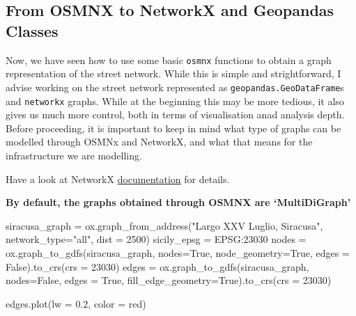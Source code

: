 \documentclass[
  letterpaper,
  DIV=11,
  numbers=noendperiod]{scrreprt}
\newenvironment{Shaded}{\begin{snugshade}}{\end{snugshade}}
\newcommand{\DecValTok}[1]{\textcolor[rgb]{0.68,0.00,0.00}{#1}}
\newcommand{\FloatTok}[1]{\textcolor[rgb]{0.68,0.00,0.00}{#1}}
\newcommand{\NormalTok}[1]{\textcolor[rgb]{0.00,0.23,0.31}{#1}}
\newcommand{\OperatorTok}[1]{\textcolor[rgb]{0.37,0.37,0.37}{#1}}
\newcommand{\StringTok}[1]{\textcolor[rgb]{0.13,0.47,0.30}{#1}}
\newcommand{\VariableTok}[1]{\textcolor[rgb]{0.07,0.07,0.07}{#1}}
\begin{document}
\subsection{From OSMNX to NetworkX and Geopandas
Classes}\label{from-osmnx-to-networkx-and-geopandas-classes}

Now, we have seen how to use some basic \texttt{osmnx} functions to
obtain a graph representation of the street network. While this is
simple and strightforward, I advise working on the street network
represented as \texttt{geopandas.GeoDataFrame}s and \texttt{networkx}
graphs. While at the beginning this may be more tedious, it also gives
us much more control, both in terms of visualisation anad analysis
depth. Before proceeding, it is important to keep in mind what type of
graphs can be modelled through OSMNx and NetworkX, and what that means
for the infrastructure we are modelling.

Have a look at NetworkX
\href{https://networkx.org/documentation/stable/reference/classes/index.html}{documentation}
for details.

\textbf{By default, the graphs obtained through OSMNX are
`MultiDiGraph'}

\begin{Shaded}
\begin{Highlighting}[]
\NormalTok{siracusa\_graph }\OperatorTok{=}\NormalTok{ ox.graph\_from\_address(}\StringTok{"Largo XXV Luglio, Siracusa"}\NormalTok{, network\_type}\OperatorTok{=}\StringTok{"all"}\NormalTok{, dist }\OperatorTok{=} \DecValTok{2500}\NormalTok{)}
\NormalTok{sicily\_epsg }\OperatorTok{=} \StringTok{\textquotesingle{}EPSG:23030\textquotesingle{}}
\NormalTok{nodes }\OperatorTok{=}\NormalTok{ ox.graph\_to\_gdfs(siracusa\_graph, nodes}\OperatorTok{=}\VariableTok{True}\NormalTok{, node\_geometry}\OperatorTok{=}\VariableTok{True}\NormalTok{, edges }\OperatorTok{=} \VariableTok{False}\NormalTok{).to\_crs(crs }\OperatorTok{=} \DecValTok{23030}\NormalTok{)}
\NormalTok{edges }\OperatorTok{=}\NormalTok{ ox.graph\_to\_gdfs(siracusa\_graph, nodes}\OperatorTok{=}\VariableTok{False}\NormalTok{, edges }\OperatorTok{=}  \VariableTok{True}\NormalTok{, fill\_edge\_geometry}\OperatorTok{=}\VariableTok{True}\NormalTok{).to\_crs(crs }\OperatorTok{=} \DecValTok{23030}\NormalTok{)}
\end{Highlighting}
\end{Shaded}

\begin{Shaded}
\begin{Highlighting}[]
\NormalTok{edges.plot(lw }\OperatorTok{=} \FloatTok{0.2}\NormalTok{, color }\OperatorTok{=} \StringTok{\textquotesingle{}red\textquotesingle{}}\NormalTok{)}
\end{Highlighting}
\end{Shaded}
\end{document}
